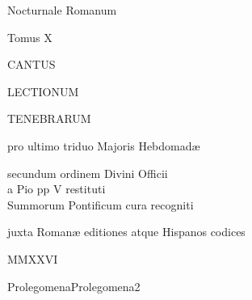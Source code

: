 \documentclass[11pt, twoside, french]{book}
\begin{document}
\begin{titlepage}
\begin{center}
\null\vspace{5mm}
{\Large\sc{}Nocturnale Romanum}

\vspace{5mm}

{\large\sc{}Tomus X}

\vspace{3cm}

{\Huge{}CANTUS}

\vspace{3mm}

{\Huge{}LECTIONUM}

\vspace{3mm}

{\Huge{}TENEBRARUM}

\vspace{5mm}

{\Large\sc{}pro ultimo triduo Majoris Hebdomadæ}

\vspace{1cm}

{\large\sc{}secundum ordinem Divini Officii\\a Pio pp V restituti\\Summorum Pontificum cura recogniti}

\vspace{5mm}

{\large\sc{}juxta Romanæ editiones atque Hispanos codices}

\vfill

MMXXVI

\end{center}
\end{titlepage}

\null

	{Prolegomena}{Prolegomena}{2}
\thispagestyle{empty}
\end{document}
